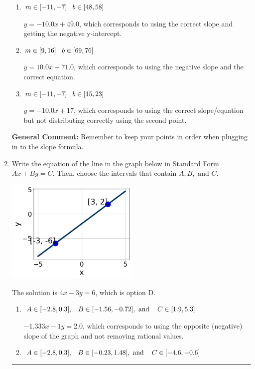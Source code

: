 \documentclass{extbook}[14pt]
\newcommand{\litem}[1]{\item #1

\rule{\textwidth}{0.4pt}}
\begin{document}
\begin{enumerate}
{\begin{enumerate}[label=\Alph*.]
 $y = -10.0x -5$, which corresponds to using the correct slope/equation but not distributing correctly using the first point.
\item \( m \in [-11, -7] \hspace*{3mm} b \in [48, 58] \)

 $y = -10.0x + 49.0$, which corresponds to using the correct slope and getting the negative y-intercept.
\item \( m \in [9, 16] \hspace*{3mm} b \in [69, 76] \)

 $y = 10.0x + 71.0$, which corresponds to using the negative slope and the correct equation.
\item \( m \in [-11, -7] \hspace*{3mm} b \in [15, 23] \)

 $y = -10.0x + 17$, which corresponds to using the correct slope/equation but not distributing correctly using the second point.
\end{enumerate}

\textbf{General Comment:} Remember to keep your points in order when plugging in to the slope formula.
}
\litem{
Write the equation of the line in the graph below in Standard Form $Ax+By=C$. Then, choose the intervals that contain $A, B, \text{ and } C$.

\begin{center}
    \includegraphics[width=0.5\textwidth]{../Figures/linearGraphToStandardA.png}
\end{center}


The solution is \( 4x - 3y = 6 \), which is option D.\begin{enumerate}[label=\Alph*.]
\item \( A \in [-2.8, 0.3], \hspace{3mm} B \in [-1.56, -0.72], \text{ and } \hspace{3mm} C \in [1.9, 5.3] \)

 $-1.333x - 1y = 2.0$, which corresponds to using the opposite (negative) slope of the graph and not removing rational values.
\item \( A \in [-2.8, 0.3], \hspace{3mm} B \in [-0.23, 1.48], \text{ and } \hspace{3mm} C \in [-4.6, -0.6] \)


\end{enumerate}}
\end{enumerate}
\end{document}
